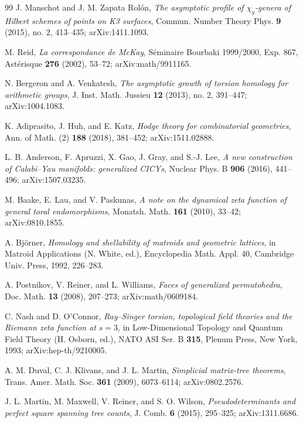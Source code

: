 \documentclass[11pt]{article}
\theoremstyle{definition}
\begin{document}
\begin{thebibliography}{99}
 J. Manschot and J. M. Zapata Rol\'on, \emph{The asymptotic profile of $\chi_y$-genera of Hilbert schemes of points on K3 surfaces}, Commun. Number Theory Phys. \textbf{9} (2015), no. 2, 413--435; arXiv:1411.1093.

 M. Reid, \emph{La correspondance de McKay}, S\'eminaire Bourbaki 1999/2000, Exp. 867, Ast\'erisque \textbf{276} (2002), 53--72; arXiv:math/9911165.

 N. Bergeron and A. Venkatesh, \emph{The asymptotic growth of torsion homology for arithmetic groups}, J. Inst. Math. Jussieu \textbf{12} (2013), no. 2, 391--447; arXiv:1004.1083.

 K. Adiprasito, J. Huh, and E. Katz, \emph{Hodge theory for combinatorial geometries}, Ann. of Math. (2) \textbf{188} (2018), 381--452; arXiv:1511.02888.

 L. B. Anderson, F. Apruzzi, X. Gao, J. Gray, and S.-J. Lee, \emph{A new construction of Calabi--Yau manifolds: generalized CICYs}, Nuclear Phys. B \textbf{906} (2016), 441--496; arXiv:1507.03235.

 M. Baake, E. Lau, and V. Paskunas, \emph{A note on the dynamical zeta function of general toral endomorphisms}, Monatsh. Math. \textbf{161} (2010), 33--42; arXiv:0810.1855.

 A. Bj\"orner, \emph{Homology and shellability of matroids and geometric lattices}, in Matroid Applications (N. White, ed.), Encyclopedia Math. Appl. 40, Cambridge Univ. Press, 1992, 226--283.

 A. Postnikov, V. Reiner, and L. Williams, \emph{Faces of generalized permutohedra}, Doc. Math. \textbf{13} (2008), 207--273; arXiv:math/0609184.

 C. Nash and D. O'Connor, \emph{Ray--Singer torsion, topological field theories and the Riemann zeta function at $s=3$}, in Low-Dimensional Topology and Quantum Field Theory (H. Osborn, ed.), NATO ASI Ser. B \textbf{315}, Plenum Press, New York, 1993; arXiv:hep-th/9210005.

 A. M. Duval, C. J. Klivans, and J. L. Martin, \emph{Simplicial matrix-tree theorems}, Trans. Amer. Math. Soc. \textbf{361} (2009), 6073--6114; arXiv:0802.2576.

 J. L. Martin, M. Maxwell, V. Reiner, and S. O. Wilson, \emph{Pseudodeterminants and perfect square spanning tree counts}, J. Comb. \textbf{6} (2015), 295--325; arXiv:1311.6686.


\end{thebibliography}
\end{document}

